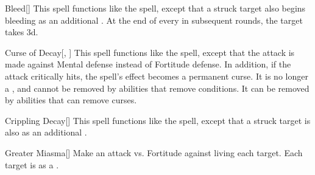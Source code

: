 \lowercase{\hypertarget{spell:Bleed}{}}\label{spell:Bleed}
\begin{freeability}[\nth{4}]{\hypertarget{spell:Bleed}{Bleed}}[]
This spell functions like the  spell, except that a struck target also begins bleeding as an additional .
At the end of every  in subsequent rounds, the target takes  \minus3d.
\end{freeability}
\vspace{0.25em}



\lowercase{\hypertarget{spell:Curse of Decay}{}}\label{spell:Curse of Decay}
\begin{freeability}[\nth{4}]{\hypertarget{spell:Curse of Decay}{Curse of Decay}}[, ]
This spell functions like the  spell, except that the attack is made against Mental defense instead of Fortitude defense.
In addition, if the attack critically hits, the spell's effect becomes a permanent curse.
It is no longer a , and cannot be removed by abilities that remove conditions.
It can be removed by abilities that can remove curses.
\end{freeability}
\vspace{0.25em}



\lowercase{\hypertarget{spell:Crippling Decay}{}}\label{spell:Crippling Decay}
\begin{freeability}[\nth{5}]{\hypertarget{spell:Crippling Decay}{Crippling Decay}}[]
This spell functions like the  spell, except that a struck target is also  as an additional .
\end{freeability}
\vspace{0.25em}



\lowercase{\hypertarget{spell:Greater Miasma}{}}\label{spell:Greater Miasma}
\begin{freeability}[\nth{5}]{\hypertarget{spell:Greater Miasma}{Greater Miasma}}[]
Make an attack vs. Fortitude against living each target.
\hit Each target is  as a .
\end{freeability}
\vspace{0.25em}



